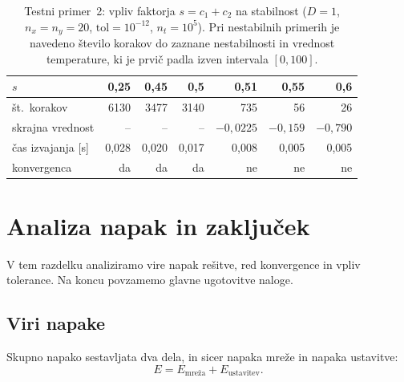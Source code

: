 \documentclass[a4paper,11pt]{article}
\begin{document}
	\begin{table}[htbp]
		\centering
		\begin{tabular}{lrrrrrr}
			\toprule
			$s$                  & 0{,}25  & 0{,}45  & 0{,}5   & 0{,}51                   & 0{,}55                   & 0{,}6                    \\
			\midrule
			št.\ korakov         & 6130    & 3477    & 3140    & 735                      & 56                       & 26                       \\
			skrajna vrednost     & --      & --      & --      & $-0{,}0225$              & $-0{,}159$               & $-0{,}790$               \\
			čas izvajanja [s]    & 0{,}028 & 0{,}020 & 0{,}017 & 0{,}008                  & 0{,}005                  & 0{,}005                  \\
			konvergenca          & da      & da      & da      & ne                       & ne                       & ne                       \\
			\bottomrule
		\end{tabular}
		\caption{Testni primer~2: vpliv faktorja $s = c_1 + c_2$ na stabilnost ($D = 1$, $n_x = n_y = 20$, $\text{tol} = 10^{-12}$, $n_t = 10^5$). Pri nestabilnih primerih je navedeno število korakov do zaznane nestabilnosti in vrednost temperature, ki je prvič padla izven intervala $[0, 100]$.}
		\label{tab:stabilnost2}
	\end{table}
	
	\newpage
	\section{Analiza napak in zaključek}
	
	V tem razdelku analiziramo vire napak rešitve, red konvergence in vpliv tolerance. Na koncu povzamemo glavne ugotovitve naloge.
	
	\subsection{Viri napake}
	
	Skupno napako sestavljata dva dela, in sicer napaka mreže in napaka ustavitve:
	\begin{equation}
		E = E_{\text{mreža}} + E_{\text{ustavitev}}.
		\label{eq:viri}
	\end{equation}
	
\end{document}
